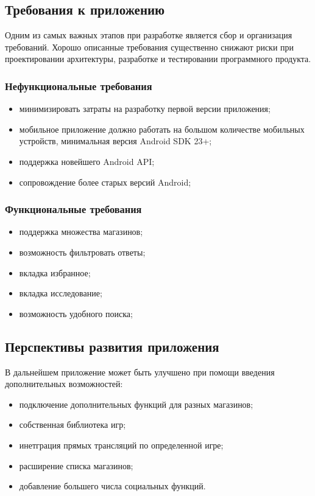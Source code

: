 \subsection{Требования к приложению}
Одним из самых важных этапов при разработке является сбор и организация требований. Хорошо описанные требования существенно снижают риски при проектировании архитектуры, разработке и тестировании программного продукта.
 
\subsubsection{Нефункциональные требования}
\begin{itemize}
 \item минимизировать затраты на разработку первой версии приложения;
 \item мобильное приложение должно работать на большом количестве мобильных устройств, минимальная версия Android SDK 23+;
 \item поддержка новейшего Android API;
 \item сопровождение более старых версий Android;
\end{itemize}
 
\subsubsection{Функциональные требования}
\begin{itemize}
  \item поддержка множества магазинов;
  \item возможность фильтровать ответы;
  \item вкладка избранное;
  \item вкладка исследование;
  \item возможность удобного поиска;
\end{itemize}
 
\subsection{Перспективы развития приложения}
В дальнейшем приложение может быть улучшено при помощи введения дополнительных возможностей:
\begin{itemize}
  \item подключение дополнительных функций для разных магазинов;
  \item собственная библиотека игр;
  \item инетграция прямых трансляций по определенной игре;
  \item расширение списка магазинов;
  \item добавление большего числа социальных функций.
\end{itemize}
